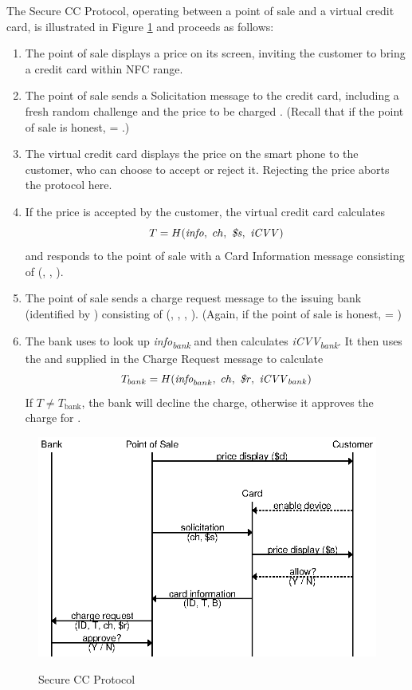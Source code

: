 The Secure CC Protocol, operating between a point of sale and a virtual credit card, is illustrated in Figure \ref{fig:secure-ccp} and proceeds as follows:

\begin{enumerate}
\item The point of sale displays a price  on its screen, inviting the customer to bring a credit card within NFC range.
\item The point of sale sends a Solicitation message to the credit card, including a fresh random challenge  and the price to be charged .
	(Recall that if the point of sale is honest,  = .)
\item The virtual credit card displays the price  on the smart phone to the customer, who can choose to accept or reject it.
	Rejecting the price aborts the protocol here.
\item If the price is accepted by the customer, the virtual credit card calculates
    $$T = H(\textrm{\emph{info}},~ ch,~ \textrm{\emph{\$s}},~ \textrm{\emph{iCVV}})$$
	and responds to the point of sale with a Card Information message consisting of (, , ).
\item The point of sale sends a charge request message to the issuing bank (identified by ) consisting of (, , , ).
	(Again, if the point of sale is honest,  = )
\item The bank uses  to look up \emph{info\textsubscript{bank}} and then calculates \emph{iCVV\textsubscript{bank}}.
	It then uses the  and  supplied in the Charge Request message to calculate
	$$T_{bank} = H(\textrm{\emph{info}}_{bank},~ ch,~ \textrm{\emph{\$r}},~ \textrm{\emph{iCVV}}_{bank})$$
	If $T \neq T_{\text{bank}}$, the bank will decline the charge, otherwise it approves the charge for .
\end{enumerate}

\begin{figure}
  \caption{Secure CC Protocol}
  \centering
    \includegraphics{img/secure_ccp.eps}
  \label{fig:secure-ccp}
\end{figure}

